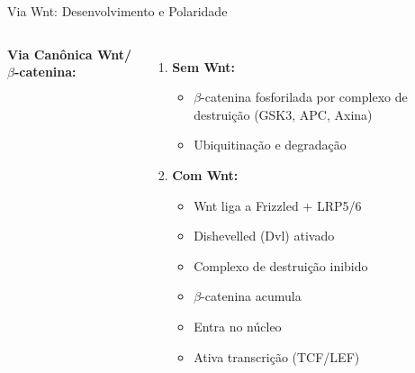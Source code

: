 \begin{frame}{Via Wnt: Desenvolvimento e Polaridade}
\begin{columns}
\textbf{Via Canônica Wnt/$\beta$-catenina:}

\begin{enumerate}
    \item \textbf{Sem Wnt:}
    \begin{itemize}
        \item $\beta$-catenina fosforilada por complexo de destruição (GSK3, APC, Axina)
        \item Ubiquitinação e degradação
    \end{itemize}

    \vspace{0.2cm}

    \item \textbf{Com Wnt:}
    \begin{itemize}
        \item Wnt liga a Frizzled + LRP5/6
        \item Dishevelled (Dvl) ativado
        \item Complexo de destruição inibido
        \item $\beta$-catenina acumula
        \item Entra no núcleo
        \item Ativa transcrição (TCF/LEF)
    \end{itemize}
\end{enumerate}

\begin{center}
\end{center}
\end{columns}
\end{frame}

